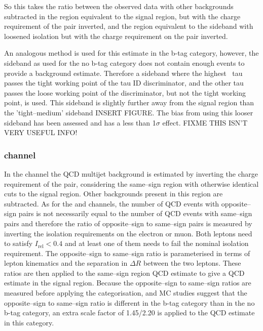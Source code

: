 So this takes the ratio between the observed data with other
backgrounds subtracted in the region equivalent to the signal region, but with the
charge requirement of the pair inverted, and the region equivalent to the sideband
with loosened isolation but with the charge requirement on the pair inverted.

An analogous method is used for this estimate in the 
b-tag category, however, the sideband as used for the 
no b-tag category does not contain enough events to 
provide a background estimate. Therefore a sideband where
the highest \pT~tau passes the tight working point of the
tau ID discriminator, and the other tau passes the loose working
point of the discriminator, but not the tight working point, is used.
This sideband is slightly further away from the signal region than the
'tight--medium' sideband INSERT FIGURE. The bias from using this looser
sideband has been assessed and has a less than 1$\sigma$ effect.
FIXME THIS ISN'T VERY USEFUL INFO!

\subsubsection{\texorpdfstring{\emu channel}{e mu channel}}
\label{sec:mssm_bkgs_qcd_em}
In the \emu channel the QCD multijet background
is estimated by inverting the charge requirement
of the pair, considering the same--sign region
with otherwise identical cuts to the signal region.
Other backgrounds present in this region are subtracted.
As for the \etau and \mutau channels, the number of
QCD events with opposite--sign \emu pairs is not
necessarily equal to the number of QCD events
with same--sign \emu pairs and therefore the ratio
of opposite--sign to same--sign pairs is measured by inverting
the isolation requirements on the electron or muon. Both
leptons need to satisfy $I_{\text{rel}} < 0.4$ and at 
least one of them needs to fail the nominal isolation requirement.
The opposite--sign to same--sign ratio is parameterised in terms
of lepton kinematics and the separation in $\Delta R$ between the
two leptons. These ratios are then applied to the same--sign region
QCD estimate to give a QCD estimate in the signal region. 
Because the opposite--sign to same--sign ratios are measured
before applying the categorisation, and \ac{MC} studies suggest
that the opposite--sign to same--sign ratio is different in the b-tag
category than in the no b-tag category, an extra scale factor of 
1.45/2.20 is applied to the QCD estimate in this category.


